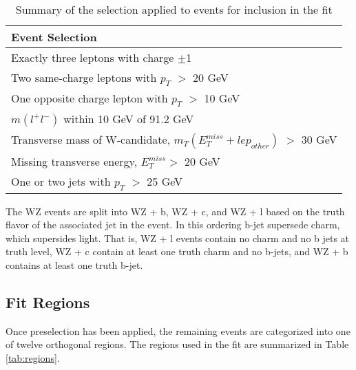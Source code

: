 \begin{table}[H] 
    \centering
    \begin{tabular}{l}
        \hline\hline
        Event Selection\\
        \hline 
        Exactly three leptons with charge $\pm$1 \\
        Two same-charge leptons with $p_T$ $>$ 20 GeV \\
        One opposite charge lepton with $p_T$ $>$ 10 GeV \\
        $m(l^+l^-)$ within 10 GeV of 91.2 GeV \\
        Transverse mass of W-candidate, $m_T(E_T^{miss} + lep_{other})$ $>$ 30 GeV \\
        Missing transverse energy, $E_T^{miss} >$ 20 GeV \\
        One or two jets with $p_T$ $>$ 25 GeV \\
        \hline\hline
    \end{tabular}
    \caption{Summary of the selection applied to events for inclusion in the fit}
    \label{tbl:selection}
\end{table}

The WZ events are split into WZ + b, WZ + c, and WZ + l based on the truth flavor of the associated jet in the event. In this ordering b-jet supersede charm, which supersides light. That is, WZ + l events contain no charm and no b jets at truth level, WZ + c contain at least one truth charm and no b-jets, and WZ + b contains at least one truth b-jet. 

\subsection{Fit Regions}
\label{subsec:regions}

Once preselection has been applied, the remaining events are categorized into one of twelve orthogonal regions. The regions used in the fit are summarized in Table \ref{tab:regions}.

